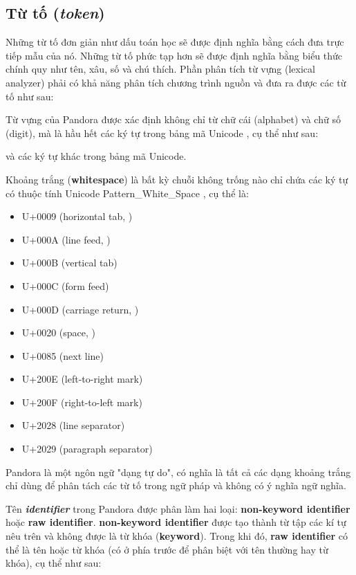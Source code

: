 \subsection{Từ tố (\textit{token})}
    Những từ tố đơn giản như dấu toán học sẽ được định nghĩa bằng cách đưa trực tiếp mẫu của nó. Những từ tố phức tạp hơn sẽ được định nghĩa bằng biểu thức chính quy như tên, xâu, số và chú thích. Phần phân tích từ vựng (lexical analyzer) phải có khả năng phân tích chương trình nguồn và đưa ra được các từ tố như sau:



    Từ vựng của Pandora được xác định không chỉ từ chữ cái (alphabet) và chữ số (digit), mà là hầu hết các ký tự trong bảng mã Unicode \cite{allen2012unicode}, cụ thể như sau:

    \regexdigit

    \regexalphabet

\noindent và các ký tự khác trong bảng mã Unicode.

    Khoảng trắng (\textbf{whitespace}) là bất kỳ chuỗi không trống nào chỉ chứa các ký tự có thuộc tính Unicode Pattern\_White\_Space \cite{web:unicode:report}, cụ thể là:
    \begin{itemize}
        \item{U+0009 (horizontal tab, )}
        \item{U+000A (line feed, )}
        \item{U+000B (vertical tab)}
        \item{U+000C (form feed)}
        \item{U+000D (carriage return, )}
        \item{U+0020 (space, )}
        \item{U+0085 (next line)}
        \item{U+200E (left-to-right mark)}
        \item{U+200F (right-to-left mark)}
        \item{U+2028 (line separator)}
        \item{U+2029 (paragraph separator)}
    \end{itemize}
\noindent Pandora là một ngôn ngữ "dạng tự do", có nghĩa là tất cả các dạng khoảng trắng chỉ dùng để phân tách các từ tố trong ngữ pháp và không có ý nghĩa ngữ nghĩa.

    Tên \textbf{\textit{identifier}} trong Pandora được phân làm hai loại: \textbf{non-keyword identifier} hoặc \textbf{raw identifier}. \textbf{non-keyword identifier} được tạo thành từ tập các kí tự nêu trên và không được là từ khóa (\textbf{keyword}). Trong khi đó, \textbf{raw identifier} có thể là tên hoặc từ khóa (có  ở phía trước để phân biệt với tên thường hay từ khóa), cụ thể như sau:

